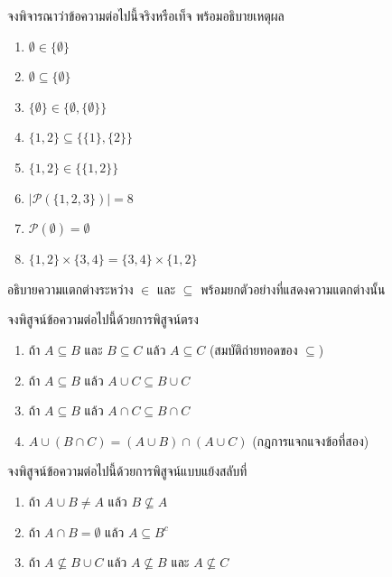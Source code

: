\begin{exercise}
จงพิจารณาว่าข้อความต่อไปนี้จริงหรือเท็จ พร้อมอธิบายเหตุผล
\begin{enumerate}
    \item $\emptyset \in \{\emptyset\}$
    \item $\emptyset \subseteq \{\emptyset\}$
    \item $\{\emptyset\} \in \{\emptyset, \{\emptyset\}\}$
    \item $\{1, 2\} \subseteq \{\{1\}, \{2\}\}$
    \item $\{1, 2\} \in \{\{1, 2\}\}$
    \item $|\mathcal{P}(\{1, 2, 3\})| = 8$
    \item $\mathcal{P}(\emptyset) = \emptyset$
    \item $\{1, 2\} \times \{3, 4\} = \{3, 4\} \times \{1, 2\}$
\end{enumerate}
\end{exercise}

\begin{exercise}
อธิบายความแตกต่างระหว่าง $\in$ และ $\subseteq$ พร้อมยกตัวอย่างที่แสดงความแตกต่างนั้น
\end{exercise}

\begin{exercise}
จงพิสูจน์ข้อความต่อไปนี้ด้วยการพิสูจน์ตรง
\begin{enumerate}
    \item ถ้า $A \subseteq B$ และ $B \subseteq C$ แล้ว $A \subseteq C$ (สมบัติถ่ายทอดของ $\subseteq$)
    \item ถ้า $A \subseteq B$ แล้ว $A \cup C \subseteq B \cup C$
    \item ถ้า $A \subseteq B$ แล้ว $A \cap C \subseteq B \cap C$
    \item $A \cup (B \cap C) = (A \cup B) \cap (A \cup C)$ (กฎการแจกแจงข้อที่สอง)
\end{enumerate}
\end{exercise}

\begin{exercise}
จงพิสูจน์ข้อความต่อไปนี้ด้วยการพิสูจน์แบบแย้งสลับที่
\begin{enumerate}
    \item ถ้า $A \cup B \neq A$ แล้ว $B \not\subseteq A$
    \item ถ้า $A \cap B = \emptyset$ แล้ว $A \subseteq B^c$
    \item ถ้า $A \not\subseteq B \cup C$ แล้ว $A \not\subseteq B$ และ $A \not\subseteq C$
\end{enumerate}
\end{exercise}

